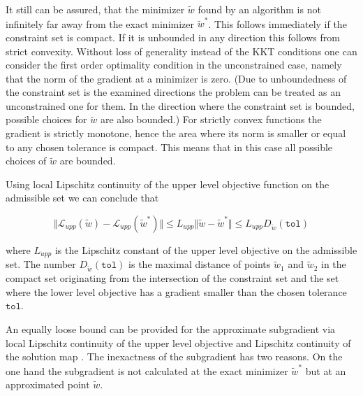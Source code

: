It still can be assured, that the minimizer \(\tilde{w}\) found by an algorithm is not infinitely far away from the exact minimizer \(\tilde{w}^*\).
This follows immediately if the constraint set is compact. If it is unbounded in any direction this follows from strict convexity.
Without loss of generality instead of the KKT conditions one can consider the first order optimality condition in the unconstrained case, namely that the norm of the gradient at a minimizer is zero. (Due to unboundedness of the constraint set is the examined directions the problem can be treated as an unconstrained one for them. In the direction where the constraint set is bounded, possible choices for \(\tilde{w}\) are also bounded.)
For strictly convex functions the gradient is strictly monotone, hence the area where its norm is smaller or equal to any chosen tolerance is compact. This means that in this case all possible choices of \(\tilde{w}\) are bounded.

Using local Lipschitz continuity of the upper level objective function on the admissible set we can conclude that

\[ \Vert \mathcal{L}_{upp}(\tilde{w})-\mathcal{L}_{upp}(\tilde{w}^*) \Vert \leq L_{upp}\Vert \tilde{w}-\tilde{w}^* \Vert \leq  L_{upp} D_{\tilde{w}}(\mathtt{tol}) \]

where \(  L_{upp}\) is the Lipschitz constant of the upper level objective on the admissible set. The number \(D_{\tilde{w}}(\mathtt{tol})\) is the maximal distance of points \(\tilde{w}_1\) and \(\tilde{w}_2\) in the compact set originating from the intersection of the constraint set and the set where the lower level objective has a gradient smaller than the chosen tolerance \(\mathtt{tol}\). 
%
%

An equally loose bound can be provided for the approximate subgradient via local Lipschitz continuity of the upper level objective and Lipschitz continuity of the solution map \cite[chapter 5]{Outrata1998}.
The inexactness of the subgradient has two reasons. On the one hand the subgradient is not calculated at the exact minimizer \(\tilde{w}^*\) but at an approximated point \(\tilde{w}\).

